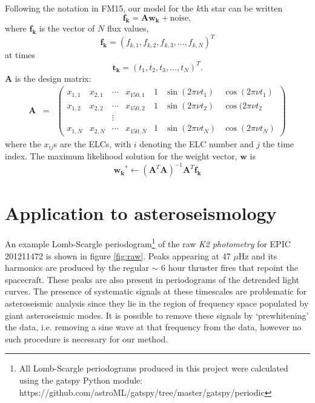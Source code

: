 \documentclass[useAMS, usenatbib]{aastex}
\begin{document}
Following the notation in FM15, our model for the $k$th star can be written
\begin{equation}
	\mathbf{f_k} = \mathbf{A}\mathbf{w_k} + \mathrm{noise},
\end{equation}
where $\mathbf{f_k}$ is the vector of $N$ flux values,
\begin{equation}
	\mathbf{f_k} = (f_{k,1}, f_{k,2}, f_{k,3}, ..., f_{k,N})^T
\end{equation}
at times
\begin{equation}
	\mathbf{t_k} = (t_1, t_2, t_3, ..., t_N)^T.
\end{equation}
$\mathbf{A}$ is the design matrix:
\begin{eqnarray}
	\mathbf{A} &=& \left (\begin{array}{ccccccc}
	x_{1,1} & x_{2,1} & \cdots & x_{150,1} & 1 & \sin(2\pi\nu t_1) & \cos(2\pi\nu t_1) \\
	x_{1,2} & x_{2,2} & \cdots & x_{150,2} & 1 & \sin(2\pi\nu t_2) & \cos(2\pi\nu t_2\\
    && \vdots &&&\\
	x_{1,N} & x_{2,N} & \cdots & x_{150,N} & 1 & \sin(2\pi\nu t_N) & \cos(2\pi\nu t_N)
\end{array}\right )
\end{eqnarray}
where the $x_{ij}$s are the ELCs, with $i$ denoting the ELC number and $j$ the
time index. The maximum likelihood solution for the weight vector,
$\mathbf{w}$ is
\begin{equation}
	\mathbf{w_k}^* \gets (\mathbf{A}^T\mathbf{A})^{-1}\mathbf{A}^T\mathbf{f_k} \end{equation}

\section{Application to asteroseismology}

An example Lomb-Scargle periodogram\footnote{All Lomb-Scargle periodograms
produced in this project were calculated using the gatspy Python module:
https://github.com/astroML/gatspy/tree/master/gatspy/periodic}
of the raw {\it K2 photometry} for EPIC 201211472 is shown in figure
\ref{fig:raw}.
Peaks appearing at 47 $\mu$Hz and its harmonics are produced by the regular
$\sim$ 6 hour thruster fires that repoint the spacecraft.
These peaks are also present in periodograms of the \citet{Vanderburg2014}
detrended light curves.
The presence of systematic signals at these timescales are problematic for
asteroseismic analysis since they lie in the region of frequency space
populated by giant asteroseismic modes.
It is possible to remove these signals by `prewhitening' the data, i.e.
removing a sine wave at that frequency from the data, however no such
procedure is necessary for our method.
\end{document}

